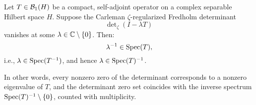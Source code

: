 \begin{lemma}
\label{lem:det_zero_implies_spectrum}

Let \( T \in \mathcal{B}_1(H) \) be a compact, self-adjoint operator on a complex separable Hilbert space \( H \). Suppose the Carleman \(\zeta\)-regularized Fredholm determinant
\[
\det\nolimits_\zeta(I - \lambda T)
\]
vanishes at some \( \lambda \in \mathbb{C} \setminus \{0\} \). Then:
\[
\lambda^{-1} \in \operatorname{Spec}(T),
\]
i.e., \( \lambda \in \operatorname{Spec}(T^{-1}) \), and hence \( \lambda \in \operatorname{Spec}(T)^{-1} \).

\medskip

\noindent
In other words, every nonzero zero of the determinant corresponds to a nonzero eigenvalue of \( T \), and the determinant zero set coincides with the inverse spectrum \( \operatorname{Spec}(T)^{-1} \setminus \{0\} \), counted with multiplicity.
\end{lemma}
